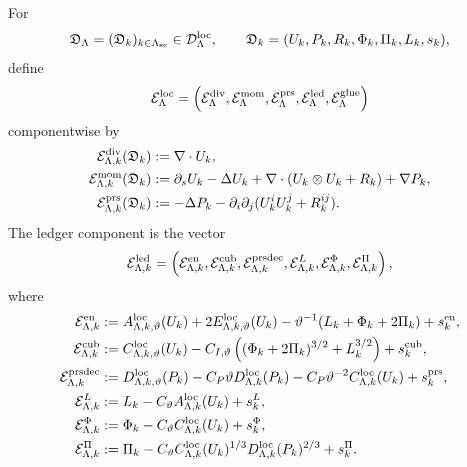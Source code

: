 \documentclass[11pt]{article}
\numberwithin{equation}{section}
\begin{document}
For
\[
        \mathfrak D_\Lambda
        =
        (\mathfrak D_k)_{k\in\Lambda_{\rm sc}}
        \in\mathcal D_\Lambda^{\rm loc},
        \qquad
        \mathfrak D_k=(U_k,P_k,R_k,\Phi_k,\Pi_k,L_k,s_k),
\]
define
\[
        \mathcal E_\Lambda^{\rm loc}
        =
        \left(
        \mathcal E_\Lambda^{\rm div},
        \mathcal E_\Lambda^{\rm mom},
        \mathcal E_\Lambda^{\rm prs},
        \mathcal E_\Lambda^{\rm led},
        \mathcal E_\Lambda^{\rm glue}
        \right)
\]
componentwise by
\begin{align}
        \mathcal E_{\Lambda,k}^{\rm div}(\mathfrak D_k)
        &:=
        \nabla\cdot U_k,\label{eq:loc-div-residual}\\
        \mathcal E_{\Lambda,k}^{\rm mom}(\mathfrak D_k)
        &:=
        \partial_sU_k-\Delta U_k
        +
        \nabla\cdot(U_k\otimes U_k+R_k)
        +
        \nabla P_k,\label{eq:loc-mom-residual}\\
        \mathcal E_{\Lambda,k}^{\rm prs}(\mathfrak D_k)
        &:=
        -\Delta P_k
        -
        \partial_i\partial_j
        (U_k^iU_k^j+R_k^{ij}).\label{eq:loc-prs-residual}
\end{align}
The ledger component is the vector
\[
        \mathcal E_{\Lambda,k}^{\rm led}
        =
        \left(
        \mathcal E_{\Lambda,k}^{\rm en},
        \mathcal E_{\Lambda,k}^{\rm cub},
        \mathcal E_{\Lambda,k}^{\rm prsdec},
        \mathcal E_{\Lambda,k}^{L},
        \mathcal E_{\Lambda,k}^{\Phi},
        \mathcal E_{\Lambda,k}^{\Pi}
        \right),
\]
where
\begin{align}
        \mathcal E_{\Lambda,k}^{\rm en}
        &:=
        A_{\Lambda,k,\vartheta}^{\rm loc}(U_k)
        +2E_{\Lambda,k,\vartheta}^{\rm loc}(U_k)
        -
        \vartheta^{-1}(L_k+\Phi_k+2\Pi_k)
        +s_k^{\rm en},\label{eq:loc-led-en-residual}\\
        \mathcal E_{\Lambda,k}^{\rm cub}
        &:=
        C_{\Lambda,k,\vartheta}^{\rm loc}(U_k)
        -
        C_{I,\vartheta}
        \left((\Phi_k+2\Pi_k)^{3/2}+L_k^{3/2}\right)
        +s_k^{\rm cub},\label{eq:loc-led-cub-residual}\\
        \mathcal E_{\Lambda,k}^{\rm prsdec}
        &:=
        D_{\Lambda,k,\vartheta}^{\rm loc}(P_k)
        -
        C_P\vartheta D_{\Lambda,k}^{\rm loc}(P_k)
        -
        C_P\vartheta^{-2}C_{\Lambda,k}^{\rm loc}(U_k)
        +s_k^{\rm prs},\label{eq:loc-led-prs-residual}\\
        \mathcal E_{\Lambda,k}^{L}
        &:=
        L_k-C_\vartheta A_{\Lambda,k}^{\rm loc}(U_k)+s_k^L,
        \label{eq:loc-led-L-residual}\\
        \mathcal E_{\Lambda,k}^{\Phi}
        &:=
        \Phi_k-C_\vartheta C_{\Lambda,k}^{\rm loc}(U_k)+s_k^\Phi,
        \label{eq:loc-led-Phi-residual}\\
        \mathcal E_{\Lambda,k}^{\Pi}
        &:=
        \Pi_k
        -
        C_\vartheta
        C_{\Lambda,k}^{\rm loc}(U_k)^{1/3}
        D_{\Lambda,k}^{\rm loc}(P_k)^{2/3}
        +s_k^\Pi .
        \label{eq:loc-led-Pi-residual}
\end{align}
\end{document}

